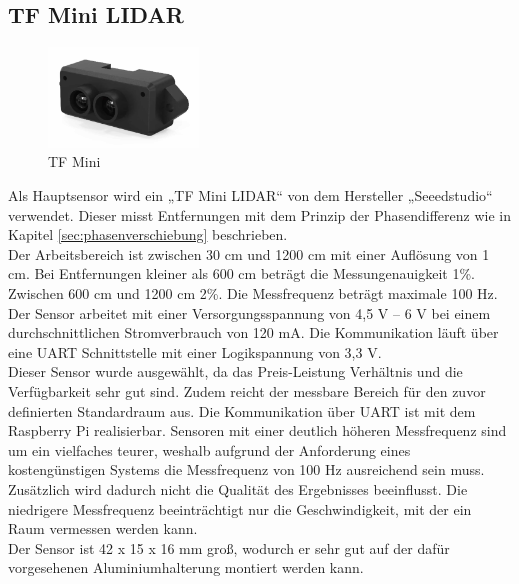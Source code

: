 \subsection{TF Mini \ac{LIDAR}}\label{tf_mini}
\begin{figure}
	\vspace{-22pt}
	\hspace{5mm}
	\includegraphics[width=4cm]{images/Hardware/TFmini.png}
	\caption{TF Mini}
	\vspace{-10pt}
\end{figure}
Als Hauptsensor wird ein „TF Mini \ac{LIDAR}“ von dem Hersteller „Seeedstudio“ verwendet. Dieser misst Entfernungen mit dem Prinzip der Phasendifferenz wie in Kapitel \ref{sec:phasenverschiebung} beschrieben.\\
Der Arbeitsbereich ist zwischen 30 cm und 1200 cm mit einer Auflösung von 1 cm. Bei Entfernungen kleiner als 600 cm beträgt die Messungenauigkeit 1\%. Zwischen 600 cm und 1200 cm 2\%. Die Messfrequenz beträgt maximale 100 Hz.\\
Der Sensor arbeitet mit einer Versorgungsspannung von 4,5 V – 6 V bei einem durchschnittlichen Stromverbrauch von 120 mA. Die Kommunikation läuft über eine \ac{UART} Schnittstelle mit einer Logikspannung von 3,3 V. \cite{TFMINI}\\
Dieser Sensor wurde ausgewählt, da das Preis-Leistung Verhältnis und die Verfügbarkeit sehr gut sind. Zudem reicht der messbare Bereich für den zuvor definierten Standardraum aus. Die Kommunikation über \ac{UART} ist mit dem Raspberry Pi realisierbar. Sensoren mit einer deutlich höheren Messfrequenz sind um ein vielfaches teurer, weshalb aufgrund der Anforderung eines kostengünstigen Systems die Messfrequenz von 100 Hz  ausreichend sein muss. Zusätzlich wird dadurch nicht die Qualität des Ergebnisses beeinflusst. Die niedrigere Messfrequenz beeinträchtigt nur die Geschwindigkeit, mit der ein Raum vermessen werden kann. \\
Der Sensor ist 42 x 15 x 16 mm groß, wodurch er sehr gut auf der dafür vorgesehenen Aluminiumhalterung montiert werden kann. 
